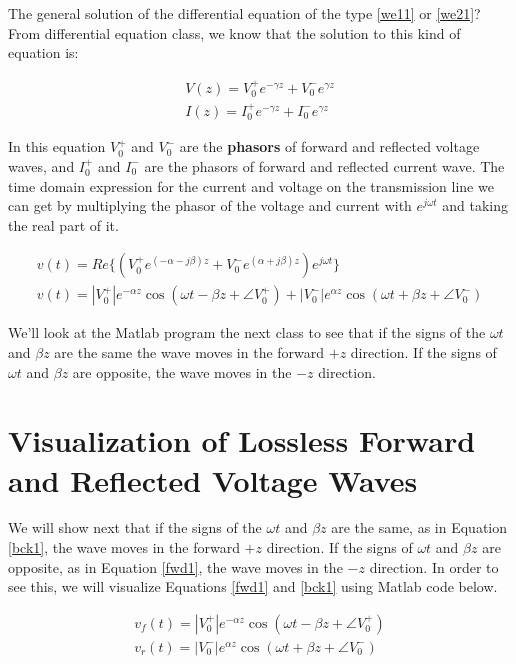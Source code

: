 \documentclass{ximera}
\begin{document}
The general solution of the differential equation of the type
\ref{we11} or \ref{we21}? From differential equation class, we know that the solution to this kind of equation is:

\begin{eqnarray}
V(z)=V_0^+ e^{-\gamma z} + V_0^- e^{\gamma z} \nonumber \\ \nonumber
I(z)=I_0^+ e^{-\gamma z} + I_0^- e^{\gamma z}
\end{eqnarray}

In this equation $V_0^+$ and $V_0^-$ are the {\bf
phasors} of forward and
reflected voltage waves, and $I_0^+$ and $I_0^-$ are the phasors of forward and
reflected  current wave.
The time domain expression for the current and voltage on the
transmission line we can get by multiplying the phasor of the voltage and current with $e^{j \omega t}$ and taking the real part of it.

\begin{eqnarray}
v(t)=Re\{ (V_0^+  e^{(-\alpha - j \beta) z} + V_0^- e^{(\alpha + j
 \beta) z})e^{j \omega t} \}  \nonumber \\ 
v(t)=|V_0^+| e^{ - \alpha z} \cos(\omega t - \beta z + \angle V_0^+)+
|V_0^-|e^{\alpha z} \cos(\omega t + \beta z + \angle V_0^-) \label{tdeq}
\end{eqnarray}

We'll look at the Matlab program the next class to see that if the signs of the $\omega t$ and
$\beta z$ are the same the wave moves in the forward $+z$
direction. If the signs of $\omega t$ and $\beta z$ are opposite, the
wave moves in the $-z$ direction.



\section{Visualization of Lossless Forward and Reflected Voltage Waves}

We will show next that if  the signs of the $\omega t$ and
$\beta z$ are the same, as in Equation \ref{bck1}, the wave moves in the forward $+z$
direction. If the signs of $\omega t$ and $\beta z$ are opposite, as in Equation \ref{fwd1}, the
wave moves in the $-z$ direction. In order to see this, we will visualize Equations \ref{fwd1} and \ref{bck1} using Matlab code below.

\begin{eqnarray}
v_f(t)=|V_0^+| e^{ - \alpha z} \cos(\omega t - \beta z + \angle V_0^+) \label{fwd1} \\
v_r(t)= |V_0^-|e^{\alpha z} \cos(\omega t + \beta z + \angle V_0^-) \label{bck1}
\end{eqnarray}
\end{document}

